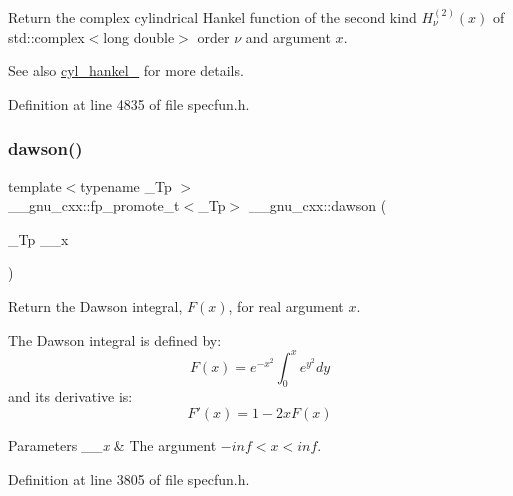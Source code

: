 Return the complex cylindrical Hankel function of the second kind $ H^{(2)}_\nu(x) $ of {\ttfamily std\+::complex$<$long double$>$} order $ \nu $ and argument $ x $.

\begin{DoxySeeAlso}{See also}
\hyperlink{group__gnu__math__spec__func_ga7ebc71dd48ac97255d72f5f5f43dfd8e}{cyl\+\_\+hankel\+\_} for more details. 
\end{DoxySeeAlso}


Definition at line 4835 of file specfun.\+h.

\mbox{\label{group__gnu__math__spec__func_gabc97cbc04fdd23593e8dccbc1421dad5}} 
\subsubsection{\texorpdfstring{dawson()}{dawson()}}
{\footnotesize\ttfamily template$<$typename \+\_\+\+Tp $>$ \\
\+\_\+\+\_\+gnu\+\_\+cxx\+::fp\+\_\+promote\+\_\+t$<$\+\_\+\+Tp$>$ \+\_\+\+\_\+gnu\+\_\+cxx\+::dawson (\begin{DoxyParamCaption}\item[{\+\_\+\+Tp}]{\+\_\+\+\_\+x }\end{DoxyParamCaption})\hspace{0.3cm}{\ttfamily [inline]}}

Return the Dawson integral, $ F(x) $, for real argument $ x $.

The Dawson integral is defined by\+: \[ F(x) = e^{-x^2}\int_0^x e^{y^2}dy \] and it\textquotesingle{}s derivative is\+: \[ F'(x) = 1 - 2xF(x) \]


\begin{DoxyParams}{Parameters}
{\em \+\_\+\+\_\+x} & The argument $ -inf < x < inf $. \\
\hline
\end{DoxyParams}


Definition at line 3805 of file specfun.\+h.

\mbox{\label{group__gnu__math__spec__func_ga0a1b8e6760b8c7869127d41d96209318}} 
